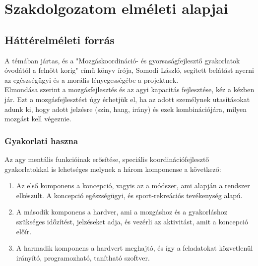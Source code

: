 \documentclass[tocnopagenum]{thesis-ekf}
\theoremstyle{definition}
\theoremstyle{remark}
\begin{document}
	

	\chapter{Szakdolgozatom elméleti alapjai}
	\section{Háttérelméleti forrás}
	\par
	A témában jártas, és a "Mozgáskoordináció- és gyorsaságfejlesztő gyakorlatok óvodától a felnőtt korig" \cite{SLaszlo} című könyv írója, Somodi László, segített belátást nyerni az egészségügyi és a morális lényegességébe a projektnek. \\ Elmondása szerint a mozgásfejlesztés és az agyi kapacitás fejlesztése, kéz a kézben jár. Ezt a mozgásfejlesztést úgy érhetjük el, ha az adott személynek utasításokat adunk ki, hogy adott jelzésre (szín, hang, irány) és ezek kombinációjára, milyen mozgást kell végeznie.
	\par 
	\subsection{Gyakorlati haszna}
	Az agy mentális funkcióinak erősítése, speciális koordinációfejlesztő gyakorlatokkal is lehetséges melynek a három komponense a következő: 
	\begin{enumerate}
	 
			\item	Az első komponens a koncepció, vagyis az a módszer, ami alapján a rendszer elkészült. A koncepció egészségügyi, és sport-rekreációs tevékenység alapú.
			\item	A második komponens a hardver, ami a mozgáshoz és a gyakorláshoz szükséges időzítést, jelzéseket adja, és vezérli az aktivitást, amit a koncepció előír.
			\item	A harmadik komponens a hardvert meghajtó, és így a feladatokat közvetlenül irányító, programozható, tanítható szoftver.
	\end{enumerate}
\end{document}
